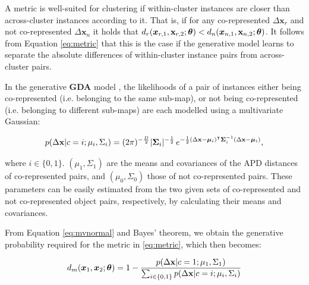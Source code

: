 A metric is well-suited for clustering if within-cluster instances are closer than across-cluster instances according to it. That is, if for any co-represented $\Delta \boldsymbol x_r$ and not co-represented $\Delta \boldsymbol x_n $ it holds that $ d_r(\boldsymbol x_{r,1}, \textbf x_{r,2}; \boldsymbol{\theta}) < d_n(\boldsymbol x_{n,1}, \textbf x_{n,2}; \boldsymbol{\theta}) $. It follows from Equation \ref{eq:metric} that this is the case if the generative model learns to separate the absolute differences of within-cluster instance pairs from across-cluster pairs.

In the generative \textbf{GDA} model \citep{bensmail1996regularized}, the likelihoods of a pair of instances either being co-represented (i.e. belonging to the same sub-map), or not being co-represented (i.e. belonging to different sub-maps) are each modelled using a multivariate Gaussian: 

\begin{equation}
\label{eq:mvnormal}
p( \Delta \textbf x | c=i; \mu_i, \Sigma_i) = (2\pi)^{-\frac{D}{2}}|\boldsymbol\Sigma_i|^{-\frac{1}{2}}\, e^{ -\frac{1}{2}(\Delta \mathbf{x}-\boldsymbol\mu_i)^\intercal\boldsymbol\Sigma_i^{-1}(\Delta \mathbf{x}-\boldsymbol\mu_i) },
\end{equation}

where $i \in \{0,1\}$. $(\mu_1, \Sigma_1)$ are the means and covariances of the APD distances of co-represented pairs, and $(\mu_0, \Sigma_0)$ those of not co-represented pairs. These parameters can be easily estimated from the two given sets of co-represented and not co-represented object pairs, respectively, by calculating their means and covariances. 

From Equation \ref{eq:mvnormal} and Bayes' theorem, we obtain the generative probability required for the metric in \ref{eq:metric}, which then becomes:

\begin{equation}
\label{eq:adsgda}
d_m(\boldsymbol x_1, \boldsymbol x_2; \boldsymbol{\theta}) = 1 - \frac{p( \Delta \textbf x | c=1; \mu_1, \Sigma_1)}{\sum_{i \in \{0,1\}} {p( \Delta \textbf x | c=i; \mu_i, \Sigma_i)}}
\end{equation}


